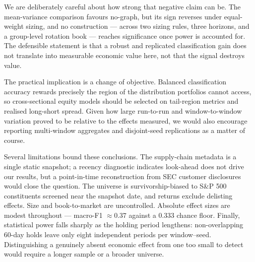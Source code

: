\documentclass[11pt]{airesearch}
\begin{document}
We are deliberately careful about how strong that negative claim can be. The
mean-variance comparison favours no-graph, but its sign reverses under
equal-weight sizing, and no construction --- across two sizing rules, three
horizons, and a group-level rotation book --- reaches significance once power
is accounted for. The defensible statement is that a robust and replicated
classification gain does not translate into measurable economic value here,
not that the signal destroys value.

The practical implication is a change of objective. Balanced classification
accuracy rewards precisely the region of the distribution portfolios cannot
access, so cross-sectional equity models should be selected on tail-region
metrics and realised long-short spread. Given how large run-to-run and
window-to-window variation proved to be relative to the effects measured, we
would also encourage reporting multi-window aggregates and disjoint-seed
replications as a matter of course.

Several limitations bound these conclusions. The supply-chain metadata is a
single static snapshot; a recency diagnostic indicates look-ahead does not
drive our results, but a point-in-time reconstruction from SEC customer
disclosures would close the question. The universe is survivorship-biased to
S\&P 500 constituents screened near the snapshot date, and returns exclude
delisting effects. Size and book-to-market are uncontrolled. Absolute effect
sizes are modest throughout --- macro-F1 ${\approx}0.37$ against a $0.333$
chance floor. Finally, statistical power falls sharply as the holding period
lengthens: non-overlapping 60-day holds leave only eight independent periods
per window--seed. Distinguishing a genuinely absent economic effect from one
too small to detect would require a longer sample or a broader universe.

\vspace{5ex}



\clearpage
\appendix
\renewcommand{\appendixpagename}{\centering \huge Appendix}
\appendixpage
{}
\startcontents[section]
\clearpage

\end{document}
